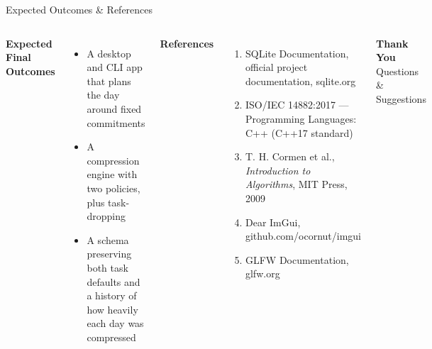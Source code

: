 \documentclass[aspectratio=169,11pt]{beamer}
\begin{document}
\begin{frame}{Expected Outcomes \& References}

\begin{columns}[T,totalwidth=\textwidth]


\textbf{\color{GEUBlue}Expected Final Outcomes}

\begin{itemize}\itemsep
\scriptsize
\item A desktop and CLI app that plans the day around fixed commitments
\item A compression engine with two policies, plus task-dropping
\item A schema preserving both task defaults and a history of how
 heavily each day was compressed
\end{itemize}


\textbf{\color{GEUBlue}References}

\begin{enumerate}\itemsep3pt
\scriptsize
\item SQLite Documentation, official project documentation, sqlite.org
\item ISO/IEC 14882:2017 --- Programming Languages: C++ (C++17 standard)
\item T. H. Cormen et al., \emph{Introduction to Algorithms}, MIT Press, 2009
\item Dear ImGui, github.com/ocornut/imgui
\item GLFW Documentation, glfw.org
\end{enumerate}

\vspace{2mm}

\begin{center}

\colorbox{GEUBlue}{
\parbox{.78\textwidth}{
\centering
\color{white}
\textbf{Thank You}\\
Questions \& Suggestions
}}

\end{center}

\end{columns}

\vfill


\end{frame}
\end{document}
